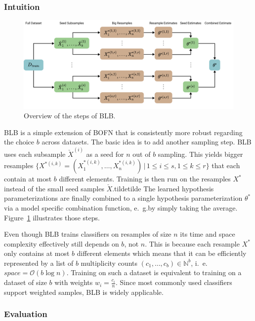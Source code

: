 \subsubsection{Intuition}%
\label{sec:params:blb:intuition}

\begin{figure}
	\centering
	\includegraphics[width=\linewidth]{gfx/blb/overview.pdf}
	\caption{Overview of the steps of BLB.}\label{fig:blb:overview}
\end{figure}
BLB is a simple extension of BOFN that is consistently more robust regarding the choice \(b\) across datasets.
The basic idea is to add another sampling step.
BLB uses each subsample \(\check{X}^{(i)}\) as a seed for \(n\) out of \(b\) sampling.
This yields bigger resamples \(\{X^{*(i, k)} = (X_1^{*(i, k)}, \dots, X_n^{*(i, k)})\, |\, 1 \leq i \leq s, 1 \leq k \leq r\}\) that each contain at most \(b\) different elements.
Training is then run on the resamples \(X^*\) instead of the small seed samples \(\check{X}\).tildetilde
The learned hypothesis parameterizations are finally combined to a single hypothesis parameterization \(\theta^*\) via a model specific combination function, e.~g.\@ by simply taking the average.
Figure~\ref{fig:blb:overview} illustrates those steps.

Even though BLB trains classifiers on resamples of size \(n\) its time and space complexity effectively still depends on \(b\), not \(n\).
This is because each resample \(X^*\) only contains at most \(b\) different elements which means that it can be efficiently represented by a list of \(b\) multiplicity counts \((c_1, \dots, c_b) \in \mathbb{N}^b\), i.~e.\@ \(\mathit{space} = \mathcal{O}(b \log n)\).
Training on such a dataset is equivalent to training on a dataset of size \(b\) with weights \(w_i = \frac{c_i}{n}\).
Since most commonly used classifiers support weighted samples, BLB is widely applicable.

\subsubsection{Evaluation}%
\label{sec:params:blb:eval}

